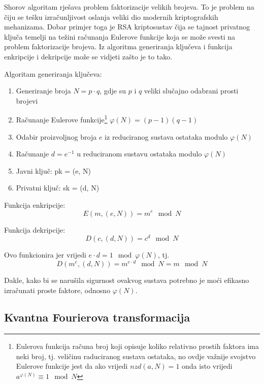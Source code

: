 Shorov algoritam rješava problem faktorizacije velikih brojeva. To je problem na čiju se tešku izračunljivost oslanja veliki dio modernih kriptografskih mehanizama. Dobar primjer toga je RSA kriptosustav čija se tajnost privatnog ključa temelji na težini računanja Eulerove funkcije koja se može svesti na problem faktorizacije brojeva. Iz algoritma generiranja ključeva i funkcija enkripcije i dekripcije može se vidjeti zašto je to tako.

Algoritam generiranja ključeva:
\begin{enumerate}
\item Generiranje broja $N = p\cdot q$, gdje su $p$ i $q$ veliki slučajno odabrani prosti brojevi
\item Računanje Eulerove funkcije\footnote{Eulerova funkcija računa broj koji opisuje koliko relativno prostih faktora ima neki broj, tj. veličinu raduciranog sustava ostataka, no ovdje važnije svojstvo Eulerove funkcije jest da ako vrijedi $nzd(a, N) = 1$ onda isto vrijedi $a^{\varphi(N)} \equiv 1\mod N$ } $\varphi(N) = (p-1)(q-1)$
\item Odabir proizvoljnog broja $e$ iz reduciranog sustava ostataka modulo $\varphi(N)$
\item Računanje $d = e^{-1}$ u reduciranom sustavu ostataka modulo $\varphi(N)$
\item Javni ključ: pk = (e, N)
\item Privatni ključ: sk = (d, N)
\end{enumerate}

Funkcija enkripcije:
\begin{equation}
E(m, (e,N)) = m^e \mod N
\end{equation}

Funkcija dekripcije:
\begin{equation}
D(c,(d,N)) = c^d \mod N
\end{equation}

Ovo funkcionira jer vrijedi $e\cdot d = 1\mod \varphi(N)$, tj.
\begin{equation}
D(m^e,(d,N)) = m^{e\cdot d} \mod N = m \mod N
\end{equation}

Dakle, kako bi se narušila sigurnost ovakvog sustava potrebno je moći efikasno izračunati proste faktore, odnosno $\varphi(N)$.

\subsection{Kvantna Fourierova transformacija}

